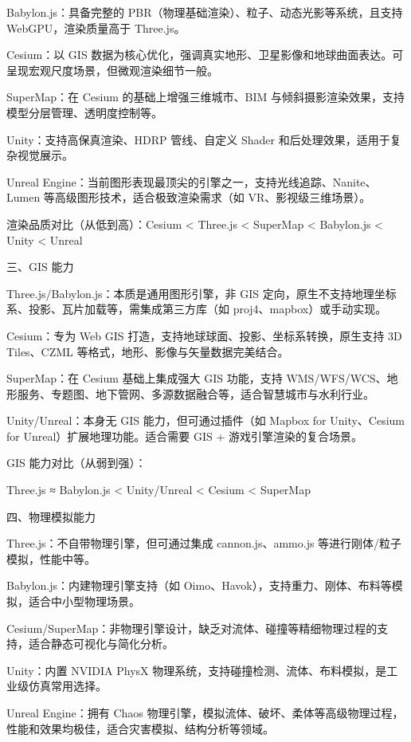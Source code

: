 Babylon.js：具备完整的 PBR（物理基础渲染）、粒子、动态光影等系统，且支持 WebGPU，渲染质量高于 Three.js。

Cesium：以 GIS 数据为核心优化，强调真实地形、卫星影像和地球曲面表达。可呈现宏观尺度场景，但微观渲染细节一般。

SuperMap：在 Cesium 的基础上增强三维城市、BIM 与倾斜摄影渲染效果，支持模型分层管理、透明度控制等。

Unity：支持高保真渲染、HDRP 管线、自定义 Shader 和后处理效果，适用于复杂视觉展示。

Unreal Engine：当前图形表现最顶尖的引擎之一，支持光线追踪、Nanite、Lumen 等高级图形技术，适合极致渲染需求（如 VR、影视级三维场景）。

渲染品质对比（从低到高）：Cesium \textless{} Three.js \textless{} SuperMap \textless{} Babylon.js \textless{} Unity \textless{} Unreal

三、GIS 能力

Three.js/Babylon.js：本质是通用图形引擎，非 GIS 定向，原生不支持地理坐标系、投影、瓦片加载等，需集成第三方库（如 proj4、mapbox）或手动实现。

Cesium：专为 Web GIS 打造，支持地球球面、投影、坐标系转换，原生支持 3D Tiles、CZML 等格式，地形、影像与矢量数据完美结合。

SuperMap：在 Cesium 基础上集成强大 GIS 功能，支持 WMS/WFS/WCS、地形服务、专题图、地下管网、多源数据融合等，适合智慧城市与水利行业。

Unity/Unreal：本身无 GIS 能力，但可通过插件（如 Mapbox for Unity、Cesium for Unreal）扩展地理功能。适合需要 GIS + 游戏引擎渲染的复合场景。

GIS 能力对比（从弱到强）：

Three.js ≈ Babylon.js \textless{} Unity/Unreal \textless{} Cesium \textless{} SuperMap

四、物理模拟能力

Three.js：不自带物理引擎，但可通过集成 cannon.js、ammo.js 等进行刚体/粒子模拟，性能中等。

Babylon.js：内建物理引擎支持（如 Oimo、Havok），支持重力、刚体、布料等模拟，适合中小型物理场景。

Cesium/SuperMap：非物理引擎设计，缺乏对流体、碰撞等精细物理过程的支持，适合静态可视化与简化分析。

Unity：内置 NVIDIA PhysX 物理系统，支持碰撞检测、流体、布料模拟，是工业级仿真常用选择。

Unreal Engine：拥有 Chaos 物理引擎，模拟流体、破坏、柔体等高级物理过程，性能和效果均极佳，适合灾害模拟、结构分析等领域。

